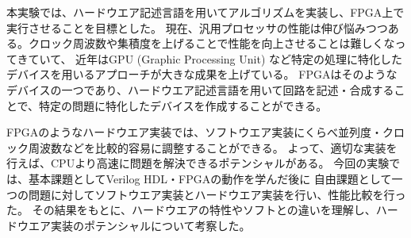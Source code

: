 本実験では、ハードウエア記述言語を用いてアルゴリズムを実装し、FPGA上で実行させることを目標とした。
現在、汎用プロセッサの性能は伸び悩みつつある。クロック周波数や集積度を上げることで性能を向上させることは難しくなってきていて、
近年はGPU (Graphic Processing Unit) など特定の処理に特化したデバイスを用いるアプローチが大きな成果を上げている。
FPGAはそのようなデバイスの一つであり、ハードウエア記述言語を用いて回路を記述・合成することで、特定の問題に特化したデバイスを作成することができる。

FPGAのようなハードウエア実装では、ソフトウエア実装にくらべ並列度・クロック周波数などを比較的容易に調整することができる。
よって、適切な実装を行えば、CPUより高速に問題を解決できるポテンシャルがある。
今回の実験では、基本課題としてVerilog HDL・FPGAの動作を学んだ後に
自由課題として一つの問題に対してソフトウエア実装とハードウエア実装を行い、性能比較を行った。
その結果をもとに、ハードウエアの特性やソフトとの違いを理解し、ハードウエア実装のポテンシャルについて考察した。

